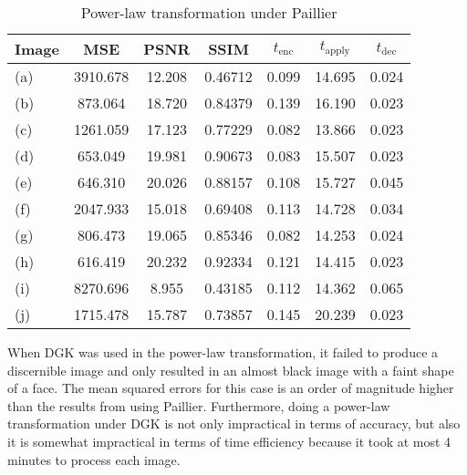 \begin{table}[h]
	\centering
	\caption{Power-law transformation under Paillier}
	\label{tbl:pwr-pal}
    \begin{tabular}{lcccccc}
        \toprule
        Image & MSE  & PSNR & SSIM & $t_\text{enc}$ & $t_\text{apply}$ & $t_\text{dec}$ \\ \midrule
        (a) & 3910.678 & 12.208 & 0.46712 & 0.099 & 14.695 & 0.024 \\
		(b) & 873.064 & 18.720 & 0.84379 & 0.139 & 16.190 & 0.023 \\
		(c) & 1261.059 & 17.123 & 0.77229 & 0.082 & 13.866 & 0.023 \\
		(d) & 653.049 & 19.981 & 0.90673 & 0.083 & 15.507 & 0.023 \\
		(e) & 646.310 & 20.026 & 0.88157 & 0.108 & 15.727 & 0.045 \\
		(f) & 2047.933 & 15.018 & 0.69408 & 0.113 & 14.728 & 0.034 \\
		(g) & 806.473 & 19.065 & 0.85346 & 0.082 & 14.253 & 0.024 \\
		(h) & 616.419 & 20.232 & 0.92334 & 0.121 & 14.415 & 0.023 \\
		(i) & 8270.696 & 8.955 & 0.43185 & 0.112 & 14.362 & 0.065 \\
		(j) & 1715.478 & 15.787 & 0.73857 & 0.145 & 20.239 & 0.023 \\
		\bottomrule
        \end{tabular}
\end{table}

When DGK was used in the power-law transformation, it failed to produce a discernible image and only resulted in an almost black image with a faint shape of a face. The mean squared errors for this case is an order of magnitude higher than the results from using Paillier. Furthermore, doing a power-law transformation under DGK is not only impractical in terms of accuracy, but also it is somewhat impractical in terms of time efficiency because it took at most 4 minutes to process each image.

